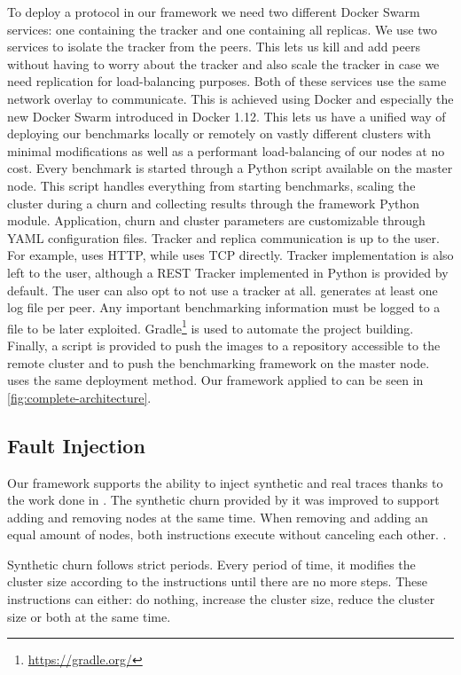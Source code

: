 To deploy a protocol in our framework we need two different Docker Swarm services: one containing the tracker and one containing all replicas. We use two services to isolate the tracker from the peers. This lets us kill and add peers without having to worry about the tracker and also scale the tracker in case we need replication for load-balancing purposes. Both of these services use the same network overlay to communicate. This is achieved using Docker and especially the new Docker Swarm introduced in Docker 1.12. This lets us have a unified way of deploying our benchmarks locally or remotely on vastly different clusters with minimal modifications as well as a performant load-balancing of our nodes at no cost. Every benchmark is started through a Python script available on the master node. This script handles everything from starting benchmarks, scaling the cluster during a churn and collecting results through the framework Python module. Application, churn and cluster  parameters are customizable through YAML configuration files. Tracker and replica communication is up to the user. For example, \epto uses HTTP, while \jgroups uses TCP directly. Tracker implementation is also left to the user, although a REST Tracker implemented in Python is provided by default. The user can also opt to not use a tracker at all. \sys generates at least one log file per peer. Any important benchmarking information must be logged to a file to be later exploited.
Gradle\footnote{\href{https://gradle.org/}{https://gradle.org/}} is used to automate the project building. Finally, a script is provided to push the images to a repository accessible to the remote cluster and to push the benchmarking framework on the master node. \jgroups uses the same deployment method. Our framework applied to \epto can be seen in \autoref{fig:complete-architecture}.
\subsection{Fault Injection}
Our framework supports the ability to inject synthetic and real traces thanks to the work done in \autocite{vaucher2016erasure}. The synthetic churn provided by it was improved to support adding and removing nodes at the same time. When removing and adding an equal amount of nodes, both instructions execute without canceling each other. .

Synthetic churn follows strict periods. Every period of time, it modifies the cluster size according to the instructions until there are no more steps. These instructions can either: do nothing, increase the cluster size, reduce the cluster size or both at the same time.

